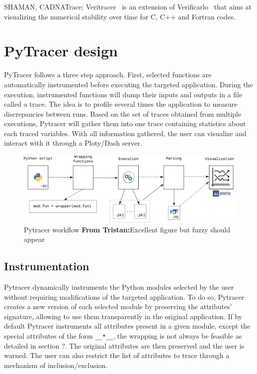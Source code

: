\documentclass[11pt]{article}
\newcommand{\tristan}[1]{\color{orange}\textbf{From Tristan:}#1\color{black}}
\begin{document}
SHAMAN, CADNATrace;
Veritracer~\cite{chatelain2018veritracer} is an extension of Verificarlo~\cite{verificarlo} that aims 
at visualizing the numerical stability over time for C, C++ and Fortran codes.

\section{PyTracer design}


PyTracer follows a three step approach. First, selected functions are automatically
instrumented before executing the targeted application. During the execution, instrumented
functions will dump their inputs and outputs in a file called a trace. 
The idea is to profile several times the application to measure discrepancies between runs.
Based on the set of traces obtained from multiple executions, Pytracer 
will gather them into one trace containing statistics about each traced variables.
With all information gathered, the user can visualize and interact with it through a Ploty/Dash server.

\begin{figure}
    \centering
    \includegraphics[width=\linewidth]{figure/workflow.pdf}
    \caption{Pytracer workflow \tristan{Excellent figure but fuzzy should appear}}
    \label{fig:workflow}
\end{figure}

\subsection{Instrumentation}

Pytracer dynamically instruments the Python modules selected by the user
without requiring modifications of the targeted application.
To do so, Pytracer creates a new version of each selected module 
by preserving the attributes' signature, allowing to use them
transparently in the original application.
If by default Pytracer instruments all attributes present
in a given module, except the special attributes of the form \texttt{\_\_*\_\_},
the wrapping is not always be feasible as detailed in section ?.
The original attributes are then preserved and the user is warned.
The user can also restrict the list of attributes to trace through
a mechanism of inclusion/exclusion. 
\end{document}
